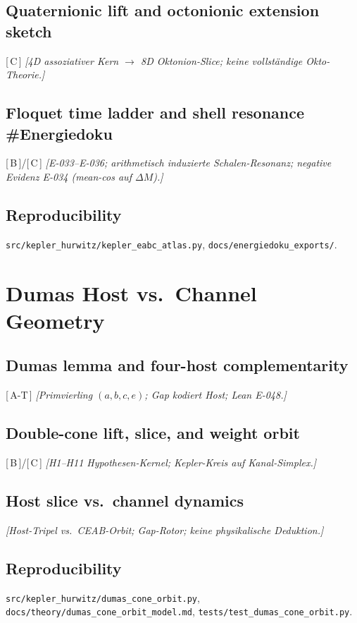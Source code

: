 \documentclass[11pt,a4paper]{article}
\newcommand{\evidence}[1]{\textnormal{[\,#1\,]}}
\newcommand{\placeholder}[1]{\textit{[#1]}}
\newcommand{\repo}[1]{\texttt{#1}}
\begin{document}
\subsection{Quaternionic lift and octonionic extension sketch}
\evidence{C}
\placeholder{4D assoziativer Kern $\to$ 8D Oktonion-Slice; keine vollständige Okto-Theorie.}

\subsection{Floquet time ladder and shell resonance \#Energiedoku}
\evidence{B}/\evidence{C}
\placeholder{E-033--E-036; arithmetisch induzierte Schalen-Resonanz;
negative Evidenz E-034 (mean-cos auf $\Delta M$).}

\subsection{Reproducibility}
\repo{src/kepler_hurwitz/kepler_eabc_atlas.py},
\repo{docs/energiedoku_exports/}.

\section{Dumas Host vs.\ Channel Geometry}
\label{sec:dumas}

\subsection{Dumas lemma and four-host complementarity}
\evidence{A-T}
\placeholder{Primvierling $(a,b,c,e)$; Gap kodiert Host; Lean E-048.}

\subsection{Double-cone lift, slice, and weight orbit}
\evidence{B}/\evidence{C}
\placeholder{H1--H11 Hypothesen-Kernel; Kepler-Kreis auf Kanal-Simplex.}

\subsection{Host slice vs.\ channel dynamics}
\placeholder{Host-Tripel vs.\ CEAB-Orbit; Gap-Rotor; keine physikalische Deduktion.}

\subsection{Reproducibility}
\repo{src/kepler_hurwitz/dumas_cone_orbit.py},
\repo{docs/theory/dumas_cone_orbit_model.md},
\repo{tests/test_dumas_cone_orbit.py}.
\end{document}
